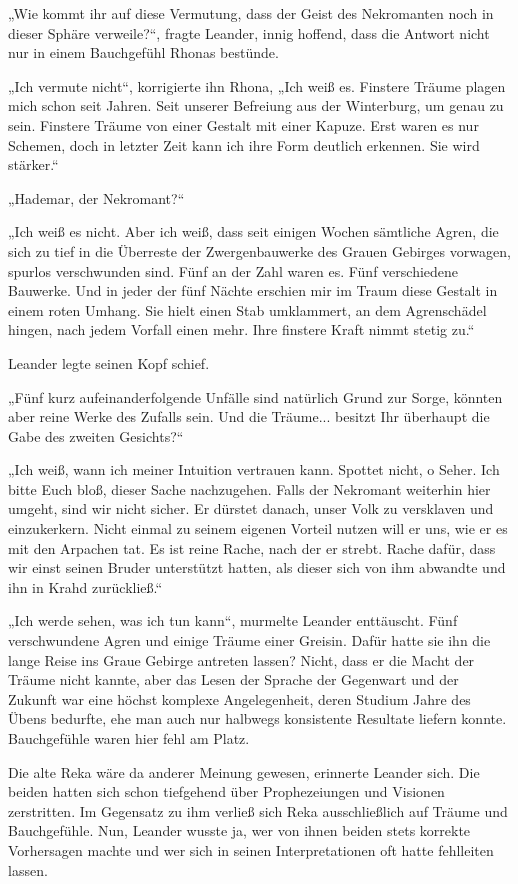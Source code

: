 „Wie kommt ihr auf diese Vermutung, dass der Geist des Nekromanten noch in dieser Sphäre verweile?“, fragte Leander, innig hoffend, dass die Antwort nicht nur in einem Bauchgefühl Rhonas bestünde.

„Ich vermute nicht“, korrigierte ihn Rhona, „Ich weiß es. Finstere Träume plagen mich schon seit Jahren. Seit unserer Befreiung aus der Winterburg, um genau zu sein. Finstere Träume von einer Gestalt mit einer Kapuze. Erst waren es nur Schemen, doch in letzter Zeit kann ich ihre Form deutlich erkennen. Sie wird stärker.“

„Hademar, der Nekromant?“

„Ich weiß es nicht. Aber ich weiß, dass seit einigen Wochen sämtliche Agren, die sich zu tief in die Überreste der Zwergenbauwerke des Grauen Gebirges vorwagen, spurlos verschwunden sind. Fünf an der Zahl waren es. Fünf verschiedene Bauwerke. Und in jeder der fünf Nächte erschien mir im Traum diese Gestalt in einem roten Umhang. Sie hielt einen Stab umklammert, an dem Agrenschädel hingen, nach jedem Vorfall einen mehr. Ihre finstere Kraft nimmt stetig zu.“

Leander legte seinen Kopf schief.

„Fünf kurz aufeinanderfolgende Unfälle sind natürlich Grund zur Sorge, könnten aber reine Werke des Zufalls sein. Und die Träume... besitzt Ihr überhaupt die Gabe des zweiten Gesichts?“

„Ich weiß, wann ich meiner Intuition vertrauen kann. Spottet nicht, o Seher. Ich bitte Euch bloß, dieser Sache nachzugehen. Falls der Nekromant weiterhin hier umgeht, sind wir nicht sicher. Er dürstet danach, unser Volk zu versklaven und einzukerkern. Nicht einmal zu seinem eigenen Vorteil nutzen will er uns, wie er es mit den Arpachen tat. Es ist reine Rache, nach der er strebt. Rache dafür, dass wir einst seinen Bruder unterstützt hatten, als dieser sich von ihm abwandte und ihn in Krahd zurückließ.“

„Ich werde sehen, was ich tun kann“, murmelte Leander enttäuscht. Fünf verschwundene Agren und einige Träume einer Greisin. Dafür hatte sie ihn die lange Reise ins Graue Gebirge antreten lassen? Nicht, dass er die Macht der Träume nicht kannte, aber das Lesen der Sprache der Gegenwart und der Zukunft war eine höchst komplexe Angelegenheit, deren Studium Jahre des Übens bedurfte, ehe man auch nur halbwegs konsistente Resultate liefern konnte. Bauchgefühle waren hier fehl am Platz.

Die alte Reka wäre da anderer Meinung gewesen, erinnerte Leander sich. Die beiden hatten sich schon tiefgehend über Prophezeiungen und Visionen zerstritten. Im Gegensatz zu ihm verließ sich Reka ausschließlich auf Träume und Bauchgefühle. Nun, Leander wusste ja, wer von ihnen beiden stets korrekte Vorhersagen machte und wer sich in seinen Interpretationen oft hatte fehlleiten lassen.

